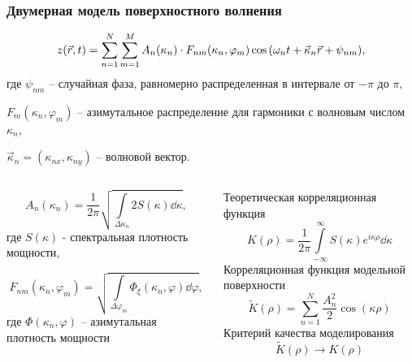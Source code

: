\documentclass[10pt,pdf,hyperref={unicode}, dvipsnames]{beamer}
\renewcommand{\phi}{\varphi}
\begin{document}
\begin{frame}[t]

\frametitle{Двумерная модель поверхностного волнения}


\begin{equation}
    \label{eq:surface2d}
    z(\vec r,t) = \sum\limits_{n=1}^{N} \sum\limits_{m=1}^{M}
    A_n(\kappa_n) \cdot
    F_{nm}(\kappa_n,\phi_m) \cos \qty(\omega_n t + \vec \kappa_n \vec r + \psi_{nm}),
\end{equation}
\footnotesize
где $\psi_{nm}$ -- случайная фаза, равномерно распределенная в интервале от
$-\pi$
до $ \pi$, 

$F_m(\kappa_n, \phi_m)$ -- азимутальное
распределение для гармоники с волновым числом  $\kappa_n$,  

$\vec \kappa_n =
(\kappa_{nx}, \kappa_{ny})$ -- 
волновой вектор. 

\begin{columns}[t]
    \begin{column}{0.49\linewidth}
    \footnotesize
    \begin{equation}
        \label{eq:Amplitude}
        A_n(\kappa_n) = \frac{1}{2 \pi} \sqrt{\int\limits_{\Delta \kappa_n} 2
            S(\kappa)
        \dd \kappa},
    \end{equation}
     где  $S(\kappa)$  - спектральная плотность
    мощности,

    \begin{equation}
        F_{nm}(\kappa_n,\phi_m) = \sqrt{\int\limits_{\Delta \phi_m}
        \Phi_{\xi}(\kappa_n,\phi) \dd \phi},
        \end{equation}
     где  $\Phi(\kappa_n, \phi)$   -- { азимутальная плотность
        мощности}
    \end{column}
    \begin{column}[T]{0.49\linewidth}
        \footnotesize
        Теоретическая корреляционная функция
        \begin{equation}
            K(\rho) = \frac{1}{2\pi} \int\limits_{-\infty}^{\infty} S(\kappa) e^{i \kappa
            \rho}\dd  \kappa
        \end{equation}
        Корреляционная функция модельной поверхности
        \begin{equation}
            \tilde K(\rho) = \sum\limits_{n=1}^{N} \frac{A_n^2}{2} \cos(\kappa \rho)
        \end{equation}
        Критерий качества моделирования
        \begin{equation}
            \tilde K(\rho) \longrightarrow K(\rho)
        \end{equation}
    \end{column}
\end{columns}
\end{frame}
\end{document}
